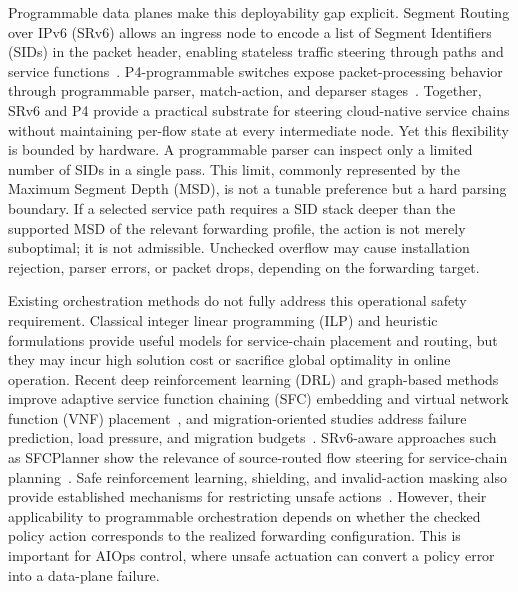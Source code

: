 \documentclass[final,5p]{elsarticle}
\newcommand{\rev}[1]{\textcolor{BrickRed}{#1}}
\begin{document}
Programmable data planes make this deployability gap explicit. Segment Routing over IPv6 (SRv6) allows an ingress node to encode a list of Segment Identifiers (SIDs) in the packet header, enabling stateless traffic steering through paths and service functions~\cite{filsfils2015segment,rfc8986,rfc9352}. P4-programmable switches expose packet-processing behavior through programmable parser, match-action, and deparser stages~\cite{jeyakumar2014p4}. Together, SRv6 and P4 provide a practical substrate for steering cloud-native service chains without maintaining per-flow state at every intermediate node. Yet this flexibility is bounded by hardware. A programmable parser can inspect only a limited number of SIDs in a single pass. This limit, commonly represented by the Maximum Segment Depth (MSD), is not a tunable preference but a hard parsing boundary. If a selected service path requires a SID stack deeper than the supported MSD of the relevant forwarding profile, the action is not merely suboptimal; it is not admissible. \rev{Unchecked overflow may cause installation rejection, parser errors, or packet drops, depending on the forwarding target.}

Existing orchestration methods do not fully address this operational safety requirement. Classical \rev{integer linear programming (ILP)} and heuristic formulations provide useful models for service-chain placement and routing, but they \rev{may incur high solution cost or sacrifice global optimality in online operation}. Recent \rev{deep reinforcement learning (DRL)} and graph-based methods improve adaptive \rev{service function chaining (SFC)} embedding and \rev{virtual network function (VNF)} placement~\cite{wang2021drl,xiao2023twostage,liu2024sfcml,taktak2024drl,wu2025drl}, and migration-oriented studies address failure prediction, load pressure, and migration budgets~\cite{zhai2023migration,addad2022ai,qin2023sfcmigrationbudget,afrasiabi2024cluster,zhang2025sfcmigration,hu2026rlpmo}. SRv6-aware approaches such as SFCPlanner show the relevance of source-routed flow steering for service-chain planning~\cite{qiu2024sfcplanner}. \rev{Safe reinforcement learning, shielding, and invalid-action masking also provide established mechanisms for restricting unsafe actions~\cite{alshiekh2018shielding,gu2024safe,wachi2024constraint,huang2022closer}. However, their applicability to programmable orchestration depends on whether the checked policy action corresponds to the realized forwarding configuration.} This is \rev{important} for AIOps control, where unsafe actuation can convert a policy error into a data-plane failure.
\end{document}
